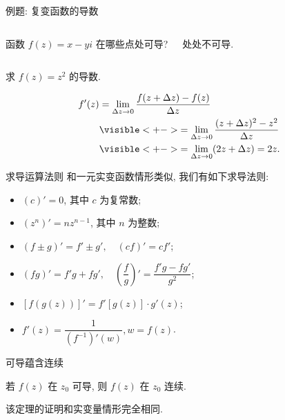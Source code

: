 \begin{frame}[<*>]{例题: 复变函数的导数}
\onslide<+->
\begin{columns}
		\begin{exercise}
		函数 $f(z)=x-yi$ 在哪些点处可导? 
		\end{exercise}\onslide<+->
		\begin{answer}
		处处不可导.
		\end{answer}
\end{columns}
\onslide<+->
\begin{example}
求 $f(z)=z^2$ 的导数.
\end{example}
\onslide<+->
\begin{solution}
\vspace{-\baselineskip}
\begin{align*}
f'(z)&=\lim_{\Delta z\to 0}\frac{f(z+\Delta z)-f(z)}{\Delta z}\\
&\visible<+->{=\lim_{\Delta z\to 0}\frac{(z+\Delta z)^2-z^2}{\Delta z}}\\
&\visible<+->{=\lim_{\Delta z\to 0}(2z+\Delta z)=2z.}
\end{align*}
\end{solution}
\end{frame}


\begin{frame}{求导运算法则}
\onslide<+->
和一元实变函数情形类似, 我们有如下求导法则:
\begin{theorem}
\begin{itemize}
\item $(c)'=0$, 其中 $c$ 为复常数;
\item $(z^n)'=nz^{n-1}$, 其中 $n$ 为整数;
\item $(f\pm g)'=f'\pm g',\quad (cf)'=cf'$;
\item $(fg)'=f'g+fg',\quad \left(\dfrac fg\right)'=\dfrac{f'g-fg'}{g^2}$;
\item $[f(g(z))]'=f'[g(z)]\cdot g'(z)$;
\item $f'(z)=\dfrac1{(f^{-1})'(w)}, w=f(z)$.
\end{itemize}
\end{theorem}
\end{frame}


\begin{frame}{可导蕴含连续}
\onslide<+->
\begin{theorem}
若 $f(z)$ 在 $z_0$ 可导, 则 $f(z)$ 在 $z_0$ 连续.
\end{theorem}
\onslide<+->
\begin{proofs}
该定理的证明和实变量情形完全相同.
\end{proofs}
\end{frame}


